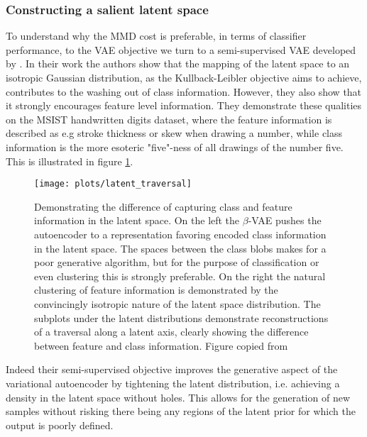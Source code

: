 \subsubsection{Constructing a salient latent space}

To understand why the MMD cost is preferable, in terms of classifier performance, to the VAE objective we turn to a semi-supervised VAE developed by \citet{Antoran2019}. In their work the authors show that the mapping of the latent space to an isotropic Gaussian distribution, as the Kullback-Leibler objective aims to achieve, contributes to the washing out of class information. However, they also show that it strongly encourages feature level information. They demonstrate these qualities on the MSIST handwritten digits dataset, where the feature information is described as e.g stroke thickness or skew when drawing a number, while class information is the more esoteric "five"-ness of all drawings of the number five. This is illustrated in figure \ref{fig:latent_traversal}.

\begin{figure}
\centering
\texttt{[image: plots/latent\_traversal]}
\caption[Difference between generative and discriminative latent spaces]{Demonstrating the difference of capturing class and feature information in the latent space. On the left the $\beta$-VAE pushes the autoencoder to a representation favoring encoded class information in the latent space. The spaces between the class blobs makes for a poor generative algorithm, but for the purpose of classification or even clustering this is strongly preferable. On the right the natural clustering of feature information is demonstrated by the convincingly isotropic nature of the latent space distribution. The subplots under the latent distributions demonstrate reconstructions of a traversal along a latent axis, clearly showing the difference between feature and class information. Figure copied from \citet{Antoran2019}}\label{fig:latent_traversal}
\end{figure}

Indeed their semi-supervised objective improves the generative aspect of the variational autoencoder by tightening the latent distribution, i.e. achieving a density in the latent space without holes. This allows for the generation of new samples without risking there being any regions of the latent prior for which the output is poorly defined.

